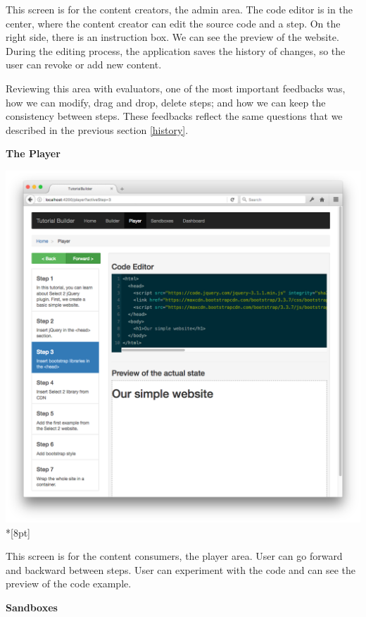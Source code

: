 \documentclass[12pt, a4paper, oneside, openright, medskipamount]{report}
\begin{document}
This screen is for the content creators, the admin area. The code editor is in the center, where the content creator can edit the source code and a step. On the right side, there is an instruction box. We can see the preview of the website. During the editing process, the application saves the history of changes, so the user can revoke or add new content.

Reviewing this area with evaluators, one of the most important feedbacks was, how we can modify, drag and drop, delete steps; and how we can keep the consistency between steps. These feedbacks reflect the same questions that we described in the previous section \ref{history}.

\newpage

\textbf{The Player}

\includegraphics[width=1\textwidth]{assets/tour-screenshots/the-player.png}\\*[8pt]

This screen is for the content consumers, the player area. User can go forward and backward between steps. User can experiment with the code and can see the preview of the code example.

\newpage

\textbf{Sandboxes}
\end{document}
